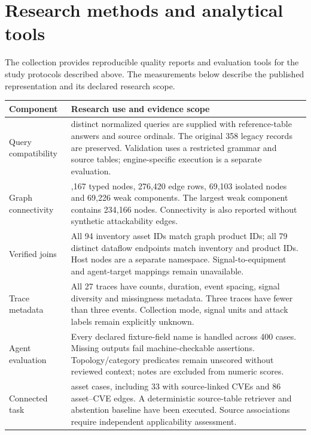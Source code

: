\clearpage\section*{Research methods and analytical tools}
The collection provides reproducible quality reports and evaluation tools for the study protocols described above. The measurements below describe the published representation and its declared research scope.

\begingroup\small\renewcommand{\arraystretch}{1.3}
\begin{tabularx}{\linewidth}{>{\raggedright\arraybackslash}p{35mm}>{\raggedright\arraybackslash}X}
\toprule\textbf{Component} & \textbf{Research use and evidence scope}\\\midrule
Query compatibility & 66 distinct normalized queries are supplied with reference-table answers and source ordinals. The original 358 legacy records are preserved. Validation uses a restricted grammar and source tables; engine-specific execution is a separate evaluation.\\
Graph connectivity & 305,167 typed nodes, 276,420 edge rows, 69,103 isolated nodes and 69,226 weak components. The largest weak component contains 234,166 nodes. Connectivity is also reported without synthetic attackability edges.\\
Verified joins & All 94 inventory asset IDs match graph product IDs; all 79 distinct dataflow endpoints match inventory and product IDs. Host nodes are a separate namespace. Signal-to-equipment and agent-target mappings remain unavailable.\\
Trace metadata & All 27 traces have counts, duration, event spacing, signal diversity and missingness metadata. Three traces have fewer than three events. Collection mode, signal units and attack labels remain explicitly unknown.\\
Agent evaluation & Every declared fixture-field name is handled across 400 cases. Missing outputs fail machine-checkable assertions. Topology/category predicates remain unscored without reviewed context; notes are excluded from numeric scores.\\
Connected task & 94 asset cases, including 33 with source-linked CVEs and 86 asset--CVE edges. A deterministic source-table retriever and abstention baseline have been executed. Source associations require independent applicability assessment.\\
\bottomrule\end{tabularx}\endgroup

